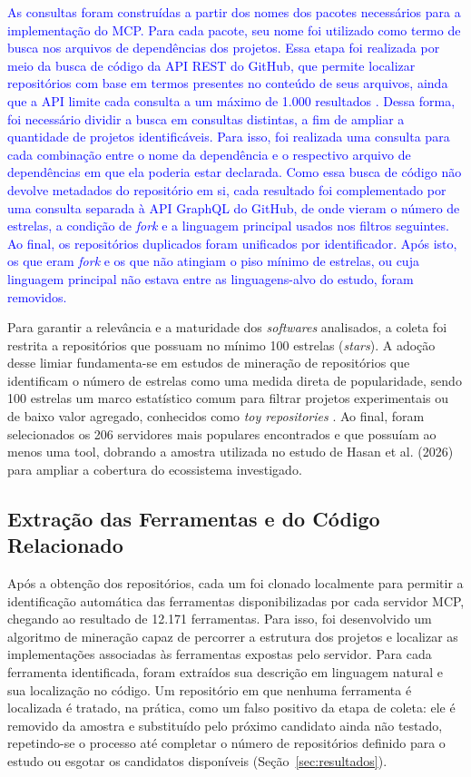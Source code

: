 \textcolor{blue} {As consultas foram construídas a partir dos nomes dos pacotes necessários para a implementação do MCP. Para cada pacote, seu nome foi utilizado como termo de busca nos arquivos de dependências dos projetos. Essa etapa foi realizada por meio da busca de código da API REST do GitHub, que permite localizar repositórios com base em termos presentes no conteúdo de seus arquivos, ainda que a API limite cada consulta a um máximo de 1.000 resultados \cite{BashInTheWild}. Dessa forma, foi necessário dividir a busca em consultas distintas, a fim de ampliar a quantidade de projetos identificáveis. Para isso, foi realizada uma consulta para cada combinação entre o nome da dependência e o respectivo arquivo de dependências em que ela poderia estar declarada. Como essa busca de código não devolve metadados do repositório em si, cada resultado foi complementado por uma consulta separada à API GraphQL do GitHub, de onde vieram o número de estrelas, a condição de \textit{fork} e a linguagem principal usados nos filtros seguintes. Ao final, os repositórios duplicados foram unificados por identificador. Após isto, os que eram \textit{fork} e os que não atingiam o piso mínimo de estrelas, ou cuja linguagem principal não estava entre as linguagens-alvo do estudo, foram removidos.}

Para garantir a relevância e a maturidade dos \textit{softwares} analisados, a coleta foi restrita a repositórios que possuam no mínimo 100 estrelas (\textit{stars}). A adoção desse limiar fundamenta-se em estudos de mineração de repositórios que identificam o número de estrelas como uma medida direta de popularidade, sendo 100 estrelas um marco estatístico comum para filtrar projetos experimentais ou de baixo valor agregado, conhecidos como \textit{toy repositories} \cite{Borges2016}. Ao final, foram selecionados os 206 servidores mais populares encontrados e que possuíam ao menos uma tool, dobrando a amostra utilizada no estudo de Hasan et al. (2026)\nocite{2026arXiv260214878M} para ampliar a cobertura do ecossistema investigado.


\subsection{Extração das Ferramentas e do Código Relacionado}

Após a obtenção dos repositórios, cada um foi clonado localmente   para permitir a identificação automática das ferramentas
disponibilizadas por cada servidor MCP, chegando ao resultado de 12.171
ferramentas. Para isso, foi desenvolvido um algoritmo de mineração capaz
de percorrer a estrutura dos projetos e localizar as implementações
associadas às ferramentas expostas pelo servidor. Para cada ferramenta
identificada, foram extraídos sua descrição em linguagem natural e sua
localização no código. Um repositório em que nenhuma ferramenta é
localizada é tratado, na prática, como um falso positivo da etapa de
coleta: ele é removido da amostra e substituído pelo próximo candidato
ainda não testado, repetindo-se o processo até completar o número de
repositórios definido para o estudo ou esgotar os candidatos disponíveis
(Seção~\ref{sec:resultados}).

